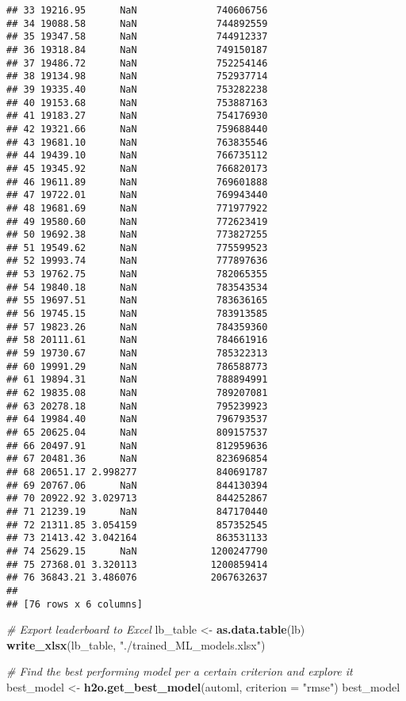 \documentclass[
]{article}
\newenvironment{Shaded}{\begin{snugshade}}{\end{snugshade}}
\newcommand{\AttributeTok}[1]{\textcolor[rgb]{0.13,0.29,0.53}{#1}}
\newcommand{\CommentTok}[1]{\textcolor[rgb]{0.56,0.35,0.01}{\textit{#1}}}
\newcommand{\FunctionTok}[1]{\textcolor[rgb]{0.13,0.29,0.53}{\textbf{#1}}}
\newcommand{\NormalTok}[1]{#1}
\newcommand{\OtherTok}[1]{\textcolor[rgb]{0.56,0.35,0.01}{#1}}
\newcommand{\StringTok}[1]{\textcolor[rgb]{0.31,0.60,0.02}{#1}}
\begin{document}
\begin{verbatim}
## 33 19216.95      NaN              740606756
## 34 19088.58      NaN              744892559
## 35 19347.58      NaN              744912337
## 36 19318.84      NaN              749150187
## 37 19486.72      NaN              752254146
## 38 19134.98      NaN              752937714
## 39 19335.40      NaN              753282238
## 40 19153.68      NaN              753887163
## 41 19183.27      NaN              754176930
## 42 19321.66      NaN              759688440
## 43 19681.10      NaN              763835546
## 44 19439.10      NaN              766735112
## 45 19345.92      NaN              766820173
## 46 19611.89      NaN              769601888
## 47 19722.01      NaN              769943440
## 48 19681.69      NaN              771977922
## 49 19580.60      NaN              772623419
## 50 19692.38      NaN              773827255
## 51 19549.62      NaN              775599523
## 52 19993.74      NaN              777897636
## 53 19762.75      NaN              782065355
## 54 19840.18      NaN              783543534
## 55 19697.51      NaN              783636165
## 56 19745.15      NaN              783913585
## 57 19823.26      NaN              784359360
## 58 20111.61      NaN              784661916
## 59 19730.67      NaN              785322313
## 60 19991.29      NaN              786588773
## 61 19894.31      NaN              788894991
## 62 19835.08      NaN              789207081
## 63 20278.18      NaN              795239923
## 64 19984.40      NaN              796793537
## 65 20625.04      NaN              809157537
## 66 20497.91      NaN              812959636
## 67 20481.36      NaN              823696854
## 68 20651.17 2.998277              840691787
## 69 20767.06      NaN              844130394
## 70 20922.92 3.029713              844252867
## 71 21239.19      NaN              847170440
## 72 21311.85 3.054159              857352545
## 73 21413.42 3.042164              863531133
## 74 25629.15      NaN             1200247790
## 75 27368.01 3.320113             1200859414
## 76 36843.21 3.486076             2067632637
## 
## [76 rows x 6 columns]
\end{verbatim}

\begin{Shaded}
\begin{Highlighting}[]
\CommentTok{\# Export leaderboard to Excel}
\NormalTok{lb\_table }\OtherTok{\textless{}{-}} \FunctionTok{as.data.table}\NormalTok{(lb)}
\FunctionTok{write\_xlsx}\NormalTok{(lb\_table, }\StringTok{"./trained\_ML\_models.xlsx"}\NormalTok{)}

\CommentTok{\# Find the best performing model per a certain criterion and explore it}
\NormalTok{best\_model }\OtherTok{\textless{}{-}} \FunctionTok{h2o.get\_best\_model}\NormalTok{(automl, }\AttributeTok{criterion =} \StringTok{"rmse"}\NormalTok{)}
\NormalTok{best\_model}
\end{Highlighting}
\end{Shaded}
\end{document}
